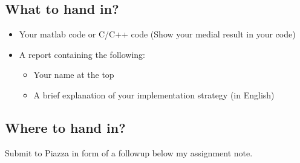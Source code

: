 \documentclass[12pt]{article}
\begin{document}
\subsection{What to hand in?}

\begin{itemize}
\item Your matlab code or C/C++ code (Show your medial result in your code)
\item A report containing the following:
\begin{itemize}
\item Your name at the top
\item A brief explanation of your implementation strategy (in English)
\end{itemize}
\end{itemize}

\subsection{Where to hand in?}

Submit to Piazza in form of a followup below my assignment note.





%
%
% 

\end{document}
